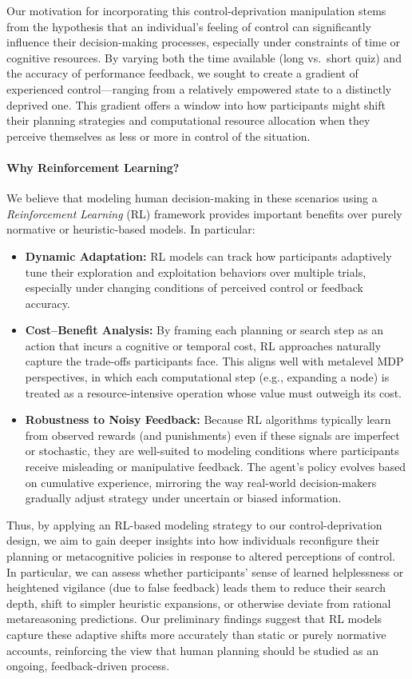 \documentclass[a4paper,12pt,oneside,article]{memoir}
\begin{document}
Our motivation for incorporating this control-deprivation manipulation stems from the hypothesis that an individual’s feeling of control can significantly influence their decision-making processes, especially under constraints of time or cognitive resources. By varying both the time available (long vs.\ short quiz) and the accuracy of performance feedback, we sought to create a gradient of experienced control—ranging from a relatively empowered state to a distinctly deprived one. This gradient offers a window into how participants might shift their planning strategies and computational resource allocation when they perceive themselves as less or more in control of the situation.

\paragraph{Why Reinforcement Learning?}
We believe that modeling human decision-making in these scenarios using a \emph{Reinforcement Learning} (RL) framework provides important benefits over purely normative or heuristic-based models. In particular:
\begin{itemize}
    \item \textbf{Dynamic Adaptation:} RL models can track how participants adaptively tune their exploration and exploitation behaviors over multiple trials, especially under changing conditions of perceived control or feedback accuracy.
    \item \textbf{Cost--Benefit Analysis:} By framing each planning or search step as an action that incurs a cognitive or temporal cost, RL approaches naturally capture the trade-offs participants face. This aligns well with metalevel MDP perspectives, in which each computational step (e.g., expanding a node) is treated as a resource-intensive operation whose value must outweigh its cost.
    \item \textbf{Robustness to Noisy Feedback:} Because RL algorithms typically learn from observed rewards (and punishments) even if these signals are imperfect or stochastic, they are well-suited to modeling conditions where participants receive misleading or manipulative feedback. The agent’s policy evolves based on cumulative experience, mirroring the way real-world decision-makers gradually adjust strategy under uncertain or biased information.
\end{itemize}

Thus, by applying an RL-based modeling strategy to our control-deprivation design, we aim to gain deeper insights into how individuals reconfigure their planning or metacognitive policies in response to altered perceptions of control. In particular, we can assess whether participants’ sense of learned helplessness or heightened vigilance (due to false feedback) leads them to reduce their search depth, shift to simpler heuristic expansions, or otherwise deviate from rational metareasoning predictions. Our preliminary findings suggest that RL models capture these adaptive shifts more accurately than static or purely normative accounts, reinforcing the view that human planning should be studied as an ongoing, feedback-driven process. 
\end{document}

